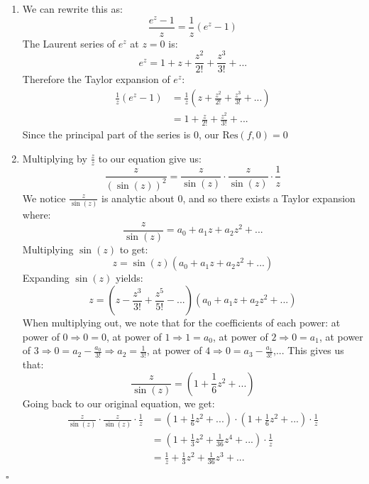 \documentclass[11pt]{article}
\newenvironment{proof}{\noindent{\bf Proof.}}{\hfill $\square$\medskip}
\begin{document}
\begin{proof}
    \begin{enumerate}[label=\textbf{(\alph*)}]
        \item We can rewrite this as:
        $$\frac{e^{z}-1}{z}=\frac{1}{z}(e^{z}-1)$$
        The Laurent series of $e^{z}$ at $z=0$ is:
        $$e^{z}=1+z+\frac{z^{2}}{2!}+\frac{z^{3}}{3!}+...$$
        Therefore the Taylor expansion of $e^{z}$:
        \begin{equation}
            \begin{split}
                \frac{1}{z}(e^{z}-1)&=\frac{1}{z}\left(z+\frac{z^{2}}{2!}+\frac{z^{3}}{3!}+...\right)\\
                &=1+\frac{z}{2!}+\frac{z^{2}}{3!}+...
            \end{split}
        \end{equation}
        Since the principal part of the series is $0$, our $\text{Res}(f,0)=0$
        \item Multiplying by $\frac{z}{z}$ to our equation give us:
        $$\frac{z}{(\sin(z))^{2}}=\frac{z}{\sin(z)}\cdot\frac{z}{\sin(z)}\cdot\frac{1}{z}$$
        We notice $\frac{z}{\sin(z)}$ is analytic about $0$, and so there exists a Taylor expansion where:
        $$\frac{z}{\sin(z)}=a_{0}+a_{1}z+a_{2}z^{2}+...$$
        Multiplying $\sin(z)$ to get:
        $$z=\sin(z)(a_{0}+a_{1}z+a_{2}z^{2}+...)$$
        Expanding $\sin(z)$ yields:
        $$z=(z-\frac{z^{3}}{3!}+\frac{z^{5}}{5!}-...)(a_{0}+a_{1}z+a_{2}z^{2}+...)$$
        When multiplying out, we note that for the coefficients of each power: at power of $0\Rightarrow 0=0$, at power of $1\Rightarrow 1=a_{0}$, at power of $2\Rightarrow 0=a_{1}$, at power of $3\Rightarrow 0=a_{2}-\frac{a_{0}}{3!}\Rightarrow a_{2}=\frac{1}{3!}$, at power of $4\Rightarrow 0=a_{3}-\frac{a_{1}}{3!}$,...
        This gives us that:
        $$\frac{z}{\sin(z)}=(1+\frac{1}{6}z^{2}+...)$$
        Going back to our original equation, we get:
        \begin{equation}
            \begin{split}
                \frac{z}{\sin(z)}\cdot\frac{z}{\sin(z)}\cdot\frac{1}{z}&=\left(1+\frac{1}{6}z^{2}+...\right)\cdot\left(1+\frac{1}{6}z^{2}+...\right)\cdot\frac{1}{z}\\
                &=(1+\frac{1}{3}z^{2}+\frac{1}{36}z^{4}+...)\cdot\frac{1}{z}\\
                &=\frac{1}{z}+\frac{1}{3}z^{2}+\frac{1}{36}z^{3}+...
            \end{split}
        \end{equation}

\end{enumerate}
\end{proof}
\end{document}
